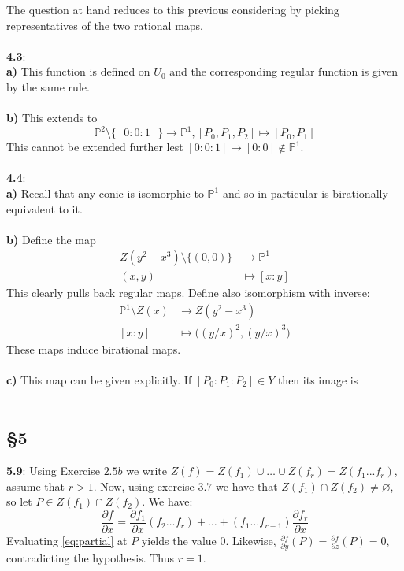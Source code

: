 \documentclass[12pt]{article}
\numberwithin{thm}{subsection}
\numberwithin{defn}{subsection}
\numberwithin{lemma}{subsection}
\numberwithin{example}{subsection}
\numberwithin{notation}{subsection}
\numberwithin{cor}{subsection}
\numberwithin{remark}{subsection}
\numberwithin{condition}{subsection}
\numberwithin{question}{subsection}
\numberwithin{construction}{subsection}
\numberwithin{construction}{subsection}
\numberwithin{construction}{subsection}
\newcommand{\bb}[1]{\mathbb{#1}}
\newcommand{\lto}{\longrightarrow}
\begin{document}
The question at hand reduces to this previous considering by picking representatives of the two rational maps.\\\\
%
\textbf{4.3}:\\
\textbf{a)} This function is defined on $U_0$ and the corresponding regular function is given by the same rule.\\\\
%
\textbf{b)} This extends to $$\bb{P}^2\setminus\lbrace [0:0:1]\rbrace \lto \bb{P}^1, [P_0,P_1,P_2] \longmapsto [P_0,P_1]$$
This cannot be extended further lest $[0:0:1] \mapsto [0:0] \not\in \bb{P}^1$.\\\\
%
\textbf{4.4}:\\
\textbf{a)} Recall that any conic is isomorphic to $\bb{P}^1$ and so in particular is birationally equivalent to it.\\\\
%
\textbf{b)} Define the map
\begin{align*}
    Z(y^2 - x^3)\setminus \lbrace (0,0) \rbrace &\lto \bb{P}^1\\
    (x,y) &\longmapsto [x:y]
\end{align*}
This clearly pulls back regular maps. Define also isomorphism with inverse:
\begin{align*}
    \bb{P}^1\setminus Z(x) &\lto Z(y^2 - x^3)\\
    [x:y] &\longmapsto \big((y/x)^2,(y/x)^3\big)
\end{align*}
These maps induce birational maps.\\\\
%
\textbf{c)} This map can be given explicitly. If $[P_0:P_1:P_2] \in Y$ then its image is \\\\
%
\subsection{\S 5}
\textbf{5.9}: Using Exercise $2.5b$ we write $Z(f) = Z(f_1) \cup \hdots \cup Z(f_r) = Z(f_1...f_r)$, assume that $r > 1$. Now, using exercise $3.7$ we have that $Z(f_1) \cap Z(f_2) \neq \varnothing$, so let $P \in Z(f_1) \cap Z(f_2)$. We have:
\begin{equation}\label{eq:partial}
\frac{\partial f}{\partial x} = \frac{\partial f_1}{\partial x}(f_2\hdots f_r) + \hdots + (f_1\hdots f_{r-1})\frac{\partial f_r}{\partial x}
\end{equation}
Evaluating \eqref{eq:partial} at $P$ yields the value $0$. Likewise, $\frac{\partial f}{\partial y}(P) = \frac{\partial f}{\partial z}(P) = 0$, contradicting the hypothesis. Thus $r = 1$.
\end{document}
